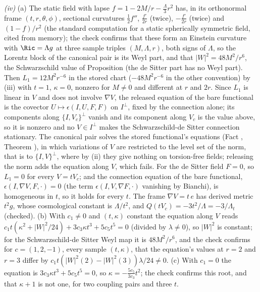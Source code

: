 \emph{(iv)} (a) The static field with lapse $f = 1 - 2M/r - \tfrac{\Lambda}{3}r^{2}$ has, in its orthonormal frame $(t, r, \theta, \phi)$, sectional curvatures $\tfrac12 f''$, $\tfrac{f'}{2r}$ (twice), $-\tfrac{f'}{2r}$ (twice) and $(1 - f)/r^{2}$ (the standard computation for a static spherically symmetric field, cited from memory); the check confirms that these form an Einstein curvature with $\Ric = \Lambda g$ at three sample triples $(M, \Lambda, r)$, both signs of $\Lambda$, so the Lorentz block of the canonical pair is its Weyl part, and that $|W|^{2} = 48M^{2}/r^{6}$, the Schwarzschild value of Proposition  (the de Sitter part has no Weyl part). Then $L_{1} = 12M^{2}r^{-6}$ in the stored chart ($-48M^{2}r^{-6}$ in the other convention) by (iii) with $t = 1$, $\kappa = 0$, nonzero for $M \neq 0$ and different at $r$ and $2r$. Since $L_{1}$ is linear in $V$ and does not involve $\nabla V$, the released equation of the bare functional is the covector $U \mapsto \epsilon(I, U, F, F)$ on $I^{\perp}$, fixed by the connection alone; its components along $\{I, V_{c}\}^{\perp}$ vanish and its component along $V_{c}$ is the value above, so it is nonzero and no $V \in I^{\perp}$ makes the Schwarzschild-de Sitter connection stationary. The canonical pair solves the stored functional's equations (Fact , Theorem ), in which variations of $V$ are restricted to the level set of the norm, that is to $\{I, V\}^{\perp}$, where by (ii) they give nothing on torsion-free fields; releasing the norm adds the equation along $V$, which fails. For the de Sitter field $F = 0$, so $L_{1} = 0$ for every $V = tV_{c}$; and the connection equation of the bare functional, $\epsilon(I, \nabla V, F, \cdot) = 0$ (the term $\epsilon(I, V, \nabla F, \cdot)$ vanishing by Bianchi), is homogeneous in $t$, so it holds for every $t$. The frame $\nabla V = t\,e$ has derived metric $t^{2}g$, whose cosmological constant is $\Lambda/t^{2}$, and $Q(tV_{c}) = -3t^{2}/\Lambda = -3/\Lambda_{t}$ (checked). (b) With $c_{1} \neq 0$ and $(t, \kappa)$ constant the equation along $V$ reads $c_{1}t(\kappa^{2} + |W|^{2}/24) + 3c_{3}\kappa t^{3} + 5c_{5}t^{5} = 0$ (divided by $\lambda \neq 0$), so $|W|^{2}$ is constant; for the Schwarzschild-de Sitter Weyl map it is $48M^{2}/r^{6}$, and the check confirms for $c = (1, 2, -1)$, every sample $(t, \kappa)$, that the equation's values at $r = 2$ and $r = 3$ differ by $c_{1}t(|W|^{2}(2) - |W|^{2}(3))\lambda/24 \neq 0$. (c) With $c_{1} = 0$ the equation is $3c_{3}\kappa t^{3} + 5c_{5}t^{5} = 0$, so $\kappa = -\tfrac{5c_{5}}{3c_{3}}t^{2}$; the check confirms this root, and that $\kappa + 1$ is not one, for two coupling pairs and three $t$.

